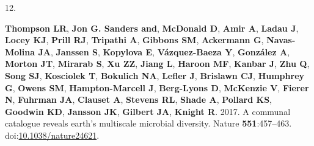\documentclass[
]{article}
\newlength{\cslhangindent}
\newlength{\csllabelwidth}
\newlength{\cslentryspacingunit} %
\newenvironment{CSLReferences}[2] %
 {%
  \setlength{\parindent}{0pt}
  \ifodd #1
  \let\oldpar\par
  \def\par{\hangindent=\cslhangindent\oldpar}
  \fi
  \setlength{\parskip}{#2\cslentryspacingunit}
 }%
 {}
\newcommand{\CSLLeftMargin}[1]{\parbox[t]{\csllabelwidth}{#1}}
\newcommand{\CSLRightInline}[1]{\parbox[t]{\linewidth - \csllabelwidth}{#1}\break}
\begin{document}
\begin{CSLReferences}{0}{1}
\leavevmode{}%
\CSLLeftMargin{12. }%
\CSLRightInline{\textbf{Thompson LR}, \textbf{Jon G. Sanders and},
\textbf{McDonald D}, \textbf{Amir A}, \textbf{Ladau J}, \textbf{Locey
KJ}, \textbf{Prill RJ}, \textbf{Tripathi A}, \textbf{Gibbons SM},
\textbf{Ackermann G}, \textbf{Navas-Molina JA}, \textbf{Janssen S},
\textbf{Kopylova E}, \textbf{Vázquez-Baeza Y}, \textbf{González A},
\textbf{Morton JT}, \textbf{Mirarab S}, \textbf{Xu ZZ}, \textbf{Jiang
L}, \textbf{Haroon MF}, \textbf{Kanbar J}, \textbf{Zhu Q}, \textbf{Song
SJ}, \textbf{Kosciolek T}, \textbf{Bokulich NA}, \textbf{Lefler J},
\textbf{Brislawn CJ}, \textbf{Humphrey G}, \textbf{Owens SM},
\textbf{Hampton-Marcell J}, \textbf{Berg-Lyons D}, \textbf{McKenzie V},
\textbf{Fierer N}, \textbf{Fuhrman JA}, \textbf{Clauset A},
\textbf{Stevens RL}, \textbf{Shade A}, \textbf{Pollard KS},
\textbf{Goodwin KD}, \textbf{Jansson JK}, \textbf{Gilbert JA},
\textbf{Knight R}. 2017. A communal catalogue reveals earth's multiscale
microbial diversity. Nature \textbf{551}:457--463.
doi:\href{https://doi.org/10.1038/nature24621}{10.1038/nature24621}.}


\end{CSLReferences}
\end{document}
